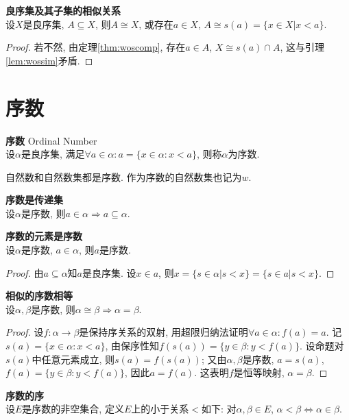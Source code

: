 \begin{col}\textbf{良序集及其子集的相似关系}\\
设$X$是良序集, $A\subseteq X$, 则$A\cong X$, 或存在$a\in X$, $A\cong s(a)=\{x\in X\vert x<a\}$.
\end{col}
\begin{proof}
若不然, 由定理\ref{thm:woscomp}, 存在$a\in A$, $X\cong s(a)\cap A$, 这与引理\ref{lem:wossim}矛盾. 
\end{proof}

\section{序数}

\begin{dfn} \textbf{序数} Ordinal Number\\
设$\alpha$是良序集, 满足$\forall a\in \alpha: a=\{x\in \alpha: x<a\}$, 则称$\alpha$为序数.
\end{dfn}
自然数和自然数集都是序数. 作为序数的自然数集也记为$w$.  

\begin{col} \textbf{序数是传递集}\\
设$\alpha$是序数, 则$a\in \alpha \Rightarrow a\subseteq \alpha$. 
\end{col}

\begin{pro} \textbf{序数的元素是序数}\\
设$\alpha$是序数, $a\in \alpha$, 则$a$是序数. 
\end{pro}
\begin{proof}
由$a\subseteq \alpha$知$a$是良序集. 设$x\in a$, 则$x=\{s\in \alpha\vert s<x\}=\{s\in a\vert s<x\}$. 
\end{proof}

\begin{pro} \textbf{相似的序数相等}\\
设$\alpha, \beta$是序数, 则$\alpha \cong  \beta\Rightarrow \alpha =\beta$. 
\label{pro:osimeq}
\end{pro}
\begin{proof}
设$f:\alpha\to \beta$是保持序关系的双射, 用超限归纳法证明$\forall a\in \alpha: f(a)=a$. 记$s(a)=\{x\in \alpha: x<a\}$, 由保序性知$f(s(a))=\{y\in \beta: y<f(a)\}$. 设命题对$s(a)$中任意元素成立, 则$s(a)=f(s(a))$; 又由$\alpha, \beta$是序数, $a=s(a)$, $f(a)=\{y\in \beta: y<f(a)\}$, 因此$a=f(a)$. 这表明$f$是恒等映射, $\alpha=\beta$.
\end{proof}

\begin{dfn} \textbf{序数的序}\\
设$E$是序数的非空集合, 定义$E$上的小于关系$<$如下: 对$\alpha, \beta\in E$, $\alpha<\beta \iff \alpha\in \beta$.
\end{dfn}


